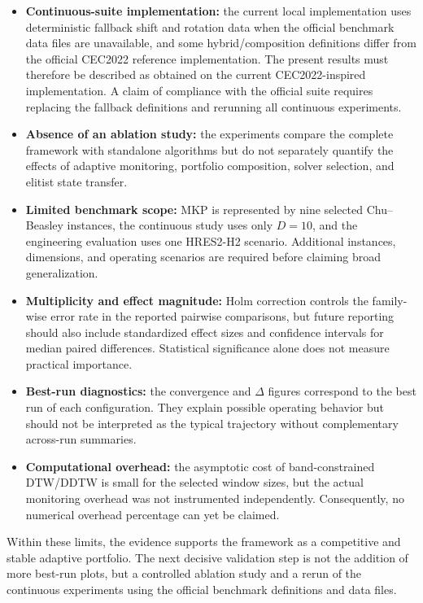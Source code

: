\begin{itemize}
    \item \textbf{Continuous-suite implementation:} the current local implementation uses deterministic fallback shift and rotation data when the official benchmark data files are unavailable, and some hybrid/composition definitions differ from the official CEC2022 reference implementation. The present results must therefore be described as obtained on the current CEC2022-inspired implementation. A claim of compliance with the official suite requires replacing the fallback definitions and rerunning all continuous experiments.
    \item \textbf{Absence of an ablation study:} the experiments compare the complete framework with standalone algorithms but do not separately quantify the effects of adaptive monitoring, portfolio composition, solver selection, and elitist state transfer.
    \item \textbf{Limited benchmark scope:} MKP is represented by nine selected Chu--Beasley instances, the continuous study uses only $D=10$, and the engineering evaluation uses one HRES2-H2 scenario. Additional instances, dimensions, and operating scenarios are required before claiming broad generalization.
    \item \textbf{Multiplicity and effect magnitude:} Holm correction controls the family-wise error rate in the reported pairwise comparisons, but future reporting should also include standardized effect sizes and confidence intervals for median paired differences. Statistical significance alone does not measure practical importance.
    \item \textbf{Best-run diagnostics:} the convergence and $\Delta$ figures correspond to the best run of each configuration. They explain possible operating behavior but should not be interpreted as the typical trajectory without complementary across-run summaries.
    \item \textbf{Computational overhead:} the asymptotic cost of band-constrained DTW/DDTW is small for the selected window sizes, but the actual monitoring overhead was not instrumented independently. Consequently, no numerical overhead percentage can yet be claimed.
\end{itemize}

Within these limits, the evidence supports the framework as a competitive and stable adaptive portfolio. The next decisive validation step is not the addition of more best-run plots, but a controlled ablation study and a rerun of the continuous experiments using the official benchmark definitions and data files.
